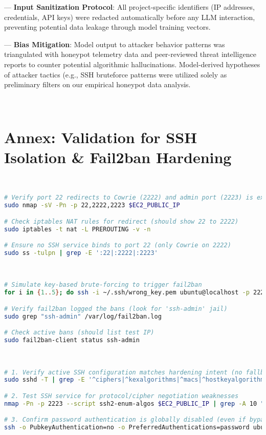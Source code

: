 --- \textbf{Input Sanitization Protocol}: All project-specific identifiers (IP addresses, credentials, API
keys) were redacted automatically before any LLM interaction, preventing potential data leakage through model training vectors.


--- \textbf{Bias Mitigation}: Model output to attacker behavior patterns was triangulated with
honeypot telemetry data and peer-reviewed threat intelligence reports to counter potential algorithmic hallucinations. Model-derived hypotheses of attacker tactics (e.g., SSH bruteforce patterns were utilized solely as preliminary filters on our empirical honeypot data analysis.


\



\newpage

\section{Annex: Validation for SSH Isolation \& Fail2ban Hardening}  
\label{annex:network}
\
\
\begin{lstlisting}[language=bash, label={annexes:network}, caption={Network Isolation Verification}]  
# Verify port 22 redirects to Cowrie (2222) and admin port (2223) is exclusive  
sudo nmap -sV -Pn -p 22,2222,2223 $EC2_PUBLIC_IP  

# Check iptables NAT rules for redirect (should show 22 to 2222)  
sudo iptables -t nat -L PREROUTING -v -n  

# Ensure no SSH service binds to port 22 (only Cowrie on 2222)  
sudo ss -tulpn | grep -E ':22|:2222|:2223'  
\end{lstlisting}  
\


\begin{lstlisting}[language=bash, label={annexes:fail2ban}, caption={Fail2ban Efficacy Testing}]  
# Simulate key-based brute-forcing to trigger fail2ban  
for i in {1..5}; do ssh -i ~/.ssh/wrong_key.pem ubuntu@localhost -p 2223; done  

# Verify fail2ban logged the bans (look for 'ssh-admin' jail)  
sudo grep "ssh-admin" /var/log/fail2ban.log  

# Check active bans (should list test IP)  
sudo fail2ban-client status ssh-admin  
\end{lstlisting}  
\


\begin{lstlisting}[language=bash, label={annexes:ssh-hardening}, caption={SSH Service Hardening Validation}]  
# 1. Verify active SSH configuration matches hardening intent (no fallback to weak protocols)  
sudo sshd -T | grep -E '^ciphers|^kexalgorithms|^macs|^hostkeyalgorithms'  

# 2. Test SSH service for protocol/cipher negotiation weaknesses  
nmap -Pn -p 2223 --script ssh2-enum-algos $EC2_PUBLIC_IP | grep -A 10 "algorithm negotiation"  

# 3. Confirm password authentication is globally disabled (even if bypass attempted)  
ssh -o PubkeyAuthentication=no -o PreferredAuthentications=password ubuntu@$EC2_PUBLIC_IP -p 2223  
\end{lstlisting}  
\





